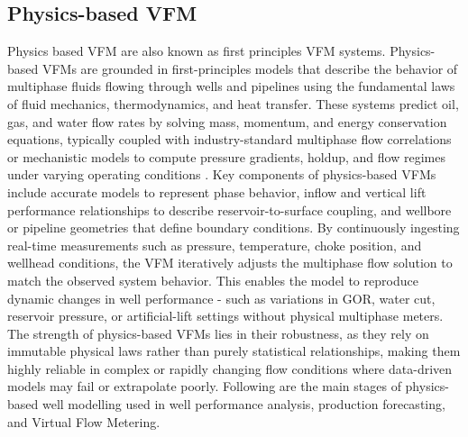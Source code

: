 \documentclass[12pt,APA]{uomthesis}
\begin{document}
\subsection{Physics-based VFM}
Physics based VFM are also known as first principles VFM systems. Physics-based VFMs are grounded in first-principles models that describe the behavior of multiphase fluids flowing through wells and pipelines using the fundamental laws of fluid mechanics, thermodynamics, and heat transfer. These systems predict oil, gas, and water flow rates by solving mass, momentum, and energy conservation equations, typically coupled with industry-standard multiphase flow correlations or mechanistic models to compute pressure gradients, holdup, and flow regimes under varying operating conditions \citep{bikmukhametov2020first, ahmed2010reservoir}. Key components of physics-based VFMs include accurate  models to represent phase behavior, inflow and vertical lift performance relationships to describe reservoir-to-surface coupling, and wellbore or pipeline geometries that define boundary conditions. By continuously ingesting real-time measurements such as pressure, temperature, choke position, and wellhead conditions, the VFM iteratively adjusts the multiphase flow solution to match the observed system behavior. This enables the model to reproduce dynamic changes in well performance - such as variations in GOR, water cut, reservoir pressure, or artificial-lift settings without physical multiphase meters. The strength of physics-based VFMs lies in their robustness, as they rely on immutable physical laws rather than purely statistical relationships, making them highly reliable in complex or rapidly changing flow conditions where data-driven models may fail or extrapolate poorly. Following are the main stages of physics-based well modelling used in well performance analysis, production forecasting, and Virtual Flow Metering. 
\end{document}
